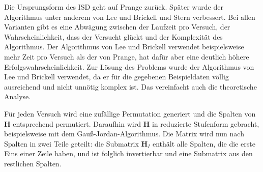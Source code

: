 \documentclass[a4paper,10pt,ngerman]{scrartcl}
\begin{document}
Die Ursprungsform des ISD geht auf Prange \cite{prangeUseInformationSets1962} zurück.
Später wurde der Algorithmus unter anderem von Lee und Brickell \cite{leeObservationSecurityMcEliece1988} und Stern \cite{sternMethodFindingCodewords1989} verbessert. 
Bei allen Varianten gibt es eine Abwägung zwischen der Laufzeit pro Versuch, der Wahrscheinlichkeit, dass der Versucht glückt und der Komplexität des Algorithmus. Der Algorithmus von Lee und Brickell verwendet beispielsweise mehr Zeit pro Versuch als der von Prange, hat dafür aber eine deutlich höhere Erfolgswahrscheinlichkeit. 
Zur Lösung des Problems wurde der Algorithmus von Lee und Brickell verwendet, da er für die gegebenen Beispieldaten völlig ausreichend und nicht unnötig komplex ist. Das vereinfacht auch die theoretische Analyse. 
Für jeden Versuch wird eine zufällige Permutation generiert und die Spalten von $\mathbf{H}$ entsprechend permutiert. Daraufhin wird $\mathbf{H}$ in reduzierte Stufenform gebracht, beispielsweise mit dem Gauß-Jordan-Algorithmus.
Die Matrix wird nun nach Spalten in zwei Teile geteilt: die Submatrix $\mathbf{H}_I$ enthält alle Spalten, die die erste Eins einer Zeile haben, und ist folglich invertierbar und eine Submatrix aus den restlichen Spalten. 
\end{document}
